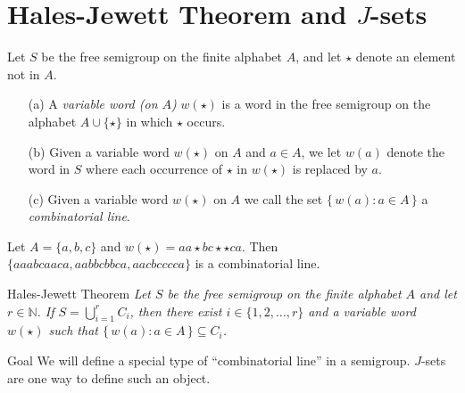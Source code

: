 \documentclass{beamer}
\newcommand{\bbN}{\mathbb{N}}
\begin{document}
\section{Hales-Jewett Theorem and $J$-sets}
\begin{frame}
  \begin{definition}
    Let $S$ be the free semigroup on the finite alphabet $A$, and let
    $\star$ denote an element not in $A$.
    \begin{itemize}
      \item[(a)] A \textsl{variable word (on $A$)} $w(\star)$ is a word in the
      free semigroup on the alphabet $A \cup \{\star\}$ in which
      $\star$ occurs.

      \item[(b)] Given a variable word $w(\star)$ on $A$ and $a \in A$,
      we let $w(a)$ denote the word in $S$ where each occurrence of
      $\star$ in $w(\star)$ is replaced by $a$.

      \item[(c)] Given a variable word $w(\star)$ on $A$ we call the set
      $\{\, w(a) : a \in A \,\}$ a \textsl{combinatorial line}.
    \end{itemize}
  \end{definition}
  
  \pause

  \begin{example}
    Let $A = \{a, b, c\}$ and $w(\star) = aa\star bc \star \star ca$.
    Then $\{aa a bc aa ca, aa b bc bb ca, aa c bc cc ca\}$ is a
    combinatorial line. 
  \end{example}
\end{frame}

\begin{frame}
  \begin{block}{Hales-Jewett Theorem}
    \textsl{Let $S$ be the free semigroup on the finite alphabet $A$
      and let $r \in \bbN$.
      If $S = \bigcup_{i=1}^r C_i$, then there exist $i \in \{1, 2,
      \ldots, r\}$ and a variable word $w(\star)$ such that $\{\, w(a)
      : a \in A \,\} \subseteq C_i$.
    }
  \end{block}

  \pause

  \begin{block}{Goal}
    We will define a special type of ``combinatorial line'' in a
    semigroup.
    \pause
    \alert{$J$-sets are one way to define such an object.}
  \end{block}
\end{frame}
\end{document}
